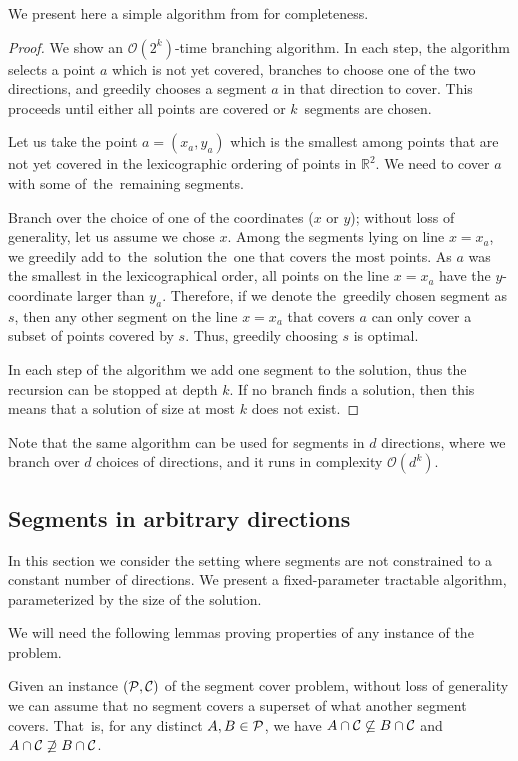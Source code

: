 We present here a simple algorithm from \cite{platypus_book} for completeness.

\begin{proof}
We show an $\mathcal{O}(2^k)$-time branching algorithm.
In each step, the algorithm selects a point $a$ which is not yet covered,
branches to choose one of the two directions, and greedily chooses
a segment $a$ in that direction to cover.
This proceeds until either all points are covered or $k$~segments are chosen.

Let us take
the point $a=(x_a,y_a)$ which is the smallest 
among points that are not yet covered
in the lexicographic ordering
of points in $\mathbb{R}^2$.
We need to cover $a$ with some of~the~remaining segments.

Branch over the choice of one of the coordinates ($x$ or $y$);
without loss of generality, let us assume we chose $x$.
Among the segments lying on line $x = x_a$,
we greedily add to~the~solution the~one that covers the most points.
As $a$ was the smallest in the lexicographical order,
all points on the line $x = x_a$ have the $y$-coordinate larger than $y_a$.
Therefore, if we denote the~greedily chosen segment as $s$,
then any other segment on the line $x = x_a$ that covers $a$ can only
cover a subset of points covered by $s$.
Thus, greedily choosing $s$ is optimal.

In each step of the algorithm we add one segment to the solution,
thus the recursion can be stopped at depth $k$.
If no branch finds a solution, then this means
that a solution of size at most $k$ does not exist.
\end{proof}

Note that the same algorithm can be used for segments in $d$ directions,
where we branch over $d$ choices of directions, and it runs in complexity $\mathcal{O}(d^k)$.

\subsection{Segments in arbitrary directions}
\label{segments_in_arbitrary_direction}
In this section we consider the setting where segments are not constrained
to a constant number of directions. 
We present a fixed-parameter tractable algorithm,
parameterized by the size of the solution.

\segmentCoverFpt*

We will need the following lemmas proving properties of any
instance of the problem.

\begin{lemma}
   \label{fpt_reduction}
   Given an instance $(\mathcal{P}, \mathcal{C})$ of the segment cover problem,
   without loss of generality we can assume that
   no segment covers a superset of what another segment covers.
   That~is, for any distinct $A, B \in \mathcal{P}$, we have
   $A \cap \mathcal{C} \not \subseteq B \cap \mathcal{C}$ and $A \cap \mathcal{C} \not \supseteq B \cap \mathcal{C}$.
\end{lemma}   
   
